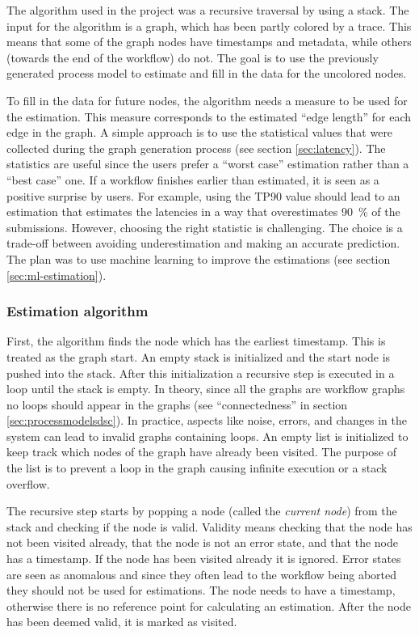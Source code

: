 The algorithm used in the project was a recursive traversal by using a stack.
The input for the algorithm is a graph, which has been partly colored by a trace.
This means that some of the graph nodes have timestamps and metadata, while others (towards the end of the workflow) do not.
The goal is to use the previously generated process model to estimate
and fill in the data for the uncolored nodes.

To fill in the data for future nodes, the algorithm needs a measure to be used for the estimation. 
This measure corresponds to the estimated ``edge length'' for each edge in the graph.
A simple approach is to use the statistical values that were collected during the graph generation process (see section \ref{sec:latency}).
The statistics are useful since the users prefer a ``worst case'' estimation rather than a ``best case'' one.
If a workflow finishes earlier than estimated, it is seen as a positive surprise by users.
For example, using the TP90 value should lead to an estimation that estimates the latencies in a way that overestimates 90~\% of the submissions.
However, choosing the right statistic is challenging.
The choice is a trade-off between avoiding underestimation and making an accurate prediction.
The plan was to use machine learning to improve the estimations (see section \ref{sec:ml-estimation}).

\subsubsection{Estimation algorithm}
First, the algorithm finds the node which has the earliest timestamp.
This is treated as the graph start.
An empty stack is initialized and the start node is pushed into the stack.
After this initialization a recursive step is executed in a loop until the stack is empty.
In theory, since all the graphs are workflow graphs no loops should appear in the graphs (see ``connectedness'' in section \ref{sec:processmodelsdsc}). 
In practice, aspects like noise, errors, and changes in the system can lead to invalid graphs containing loops.
An empty list is initialized to keep track which nodes of the graph have already been visited.
The purpose of the list is to prevent a loop in the graph causing infinite execution or a stack overflow.

The recursive step starts by popping a node (called the \emph{current node}) from the stack and checking if the node is valid.
Validity means checking that the node has not been visited already, that the node is not an error state, and that the node has a timestamp.
If the node has been visited already it is ignored.
Error states are seen as anomalous and since they often lead to the workflow being aborted they should not be used for estimations.
The node needs to have a timestamp, otherwise there is no reference point for calculating an estimation.
After the node has been deemed valid, it is marked as visited.

